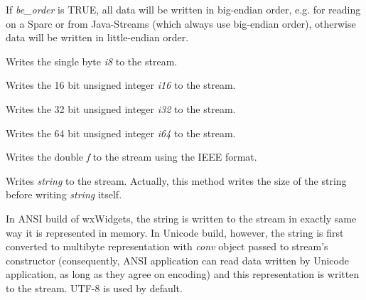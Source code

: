 
If {\it be\_order} is TRUE, all data will be written in big-endian
order, e.g. for reading on a Sparc or from Java-Streams (which
always use big-endian order), otherwise data will be written in
little-endian order.
 


Writes the single byte {\it i8} to the stream.



Writes the 16 bit unsigned integer {\it i16} to the stream.



Writes the 32 bit unsigned integer {\it i32} to the stream.



Writes the 64 bit unsigned integer {\it i64} to the stream.



Writes the double {\it f} to the stream using the IEEE format.

\label{wxdataoutputstreamwritestring}


Writes {\it string} to the stream. Actually, this method writes the size of
the string before writing {\it string} itself.

In ANSI build of wxWidgets, the string is written to the stream in exactly
same way it is represented in memory. In Unicode build, however, the string
is first converted to multibyte representation with {\it conv} object passed
to stream's constructor (consequently, ANSI application can read data 
written by Unicode application, as long as they agree on encoding) and this
representation is written to the stream. UTF-8 is used by default.

